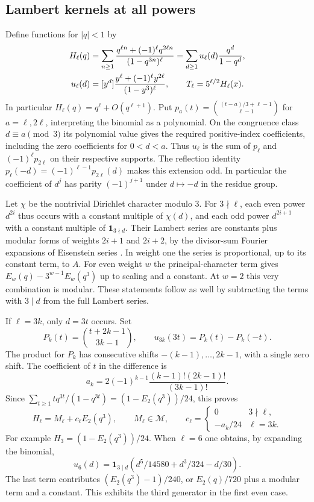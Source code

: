 \documentclass[11pt,a4paper]{article}
\theoremstyle{definition}
\theoremstyle{remark}
\numberwithin{equation}{section}
\begin{document}
\subsection{Lambert kernels at all powers}
Define functions for $|q|<1$ by
\begin{align}
 H_\ell(q)
 &=\sum_{n\ge1}\frac{q^{\ell n}+(-1)^\ell q^{2\ell n}}{(1-q^{3n})^\ell}
 =\sum_{d\ge1}u_\ell(d)\frac{q^d}{1-q^d},\label{eq:Hl}\\
 u_\ell(d)&=[y^d]\frac{y^\ell+(-1)^\ell y^{2\ell}}{(1-y^3)^\ell},
 \qquad T_\ell=5^{\ell/2}H_\ell(x).\notag
\end{align}
In particular $H_\ell(q)=q^\ell+O(q^{\ell+1})$. Put $p_a(t)=\binom{(t-a)/3+\ell-1}{\ell-1}$ for $a=\ell,2\ell$, interpreting the binomial as a polynomial. On the congruence class $d\equiv a\pmod3$ its polynomial value gives the required positive-index coefficients, including the zero coefficients for $0<d<a$. Thus $u_\ell$ is the sum of $p_\ell$ and $(-1)^\ell p_{2\ell}$ on their respective supports. The reflection identity $p_\ell(-d)=(-1)^{\ell-1}p_{2\ell}(d)$ makes this extension odd. In particular the coefficient of $d^j$ has parity $(-1)^{j+1}$ under $d\mapsto-d$ in the residue group.

Let $\chi$ be the nontrivial Dirichlet character modulo 3. For $3\nmid\ell$, each even power $d^{2i}$ thus occurs with a constant multiple of $\chi(d)$, and each odd power $d^{2i+1}$ with a constant multiple of $\mathbf1_{3\nmid d}$. Their Lambert series are constants plus modular forms of weights $2i+1$ and $2i+2$, by the divisor-sum Fourier expansions of Eisenstein series \cite[Prop.~2.2 and Rem.~2.4]{BG}. In weight one the series is proportional, up to its constant term, to $A$. For even weight $w$ the principal-character term gives $E_w(q)-3^{w-1}E_w(q^3)$ up to scaling and a constant. At $w=2$ this very combination is modular. These statements follow as well by subtracting the terms with $3\mid d$ from the full Lambert series.

If $\ell=3k$, only $d=3t$ occurs. Set
\[
 P_k(t)=\binom{t+2k-1}{3k-1},\qquad u_{3k}(3t)=P_k(t)-P_k(-t).
\]
The product for $P_k$ has consecutive shifts $-(k-1),\ldots,2k-1$, with a single zero shift. The coefficient of $t$ in the difference is
\begin{equation}\label{eq:linear-anomaly}
 a_k=2(-1)^{k-1}\frac{(k-1)!(2k-1)!}{(3k-1)!}.
\end{equation}
Since $\sum_{t\ge1}tq^{3t}/(1-q^{3t})=(1-E_2(q^3))/24$, this proves
\begin{equation}\label{eq:split}
 H_\ell=M_\ell+c_\ell E_2(q^3),\qquad M_\ell\in\mathcal M,\qquad
 c_\ell=\begin{cases}0&3\nmid\ell,\\-a_k/24&\ell=3k.\end{cases}
\end{equation}
For example $H_3=(1-E_2(q^3))/24$. When $\ell=6$ one obtains, by expanding the binomial,
\[
 u_6(d)=\mathbf1_{3\mid d}(d^5/14580+d^3/324-d/30).
\]
The last term contributes $(E_2(q^3)-1)/240$, or $E_2(q)/720$ plus a modular term and a constant. This exhibits the third generator in the first even case.
\end{document}
